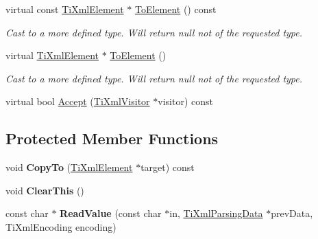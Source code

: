 \begin{DoxyCompactItemize}
\item 
virtual const \hyperlink{classTiXmlElement}{Ti\+Xml\+Element} $\ast$ \hyperlink{classTiXmlElement_ac5b8d0e25fa23fd9acbb6d146082901c}{To\+Element} () const \hypertarget{classTiXmlElement_ac5b8d0e25fa23fd9acbb6d146082901c}{}\label{classTiXmlElement_ac5b8d0e25fa23fd9acbb6d146082901c}

\begin{DoxyCompactList}\small\item\em Cast to a more defined type. Will return null not of the requested type. \end{DoxyCompactList}\item 
virtual \hyperlink{classTiXmlElement}{Ti\+Xml\+Element} $\ast$ \hyperlink{classTiXmlElement_a9def86337ea7a755eb41cac980f60c7a}{To\+Element} ()\hypertarget{classTiXmlElement_a9def86337ea7a755eb41cac980f60c7a}{}\label{classTiXmlElement_a9def86337ea7a755eb41cac980f60c7a}

\begin{DoxyCompactList}\small\item\em Cast to a more defined type. Will return null not of the requested type. \end{DoxyCompactList}\item 
virtual bool \hyperlink{classTiXmlElement_a31ab28cc3b892a69254391d6bbe08df3}{Accept} (\hyperlink{classTiXmlVisitor}{Ti\+Xml\+Visitor} $\ast$visitor) const 
\end{DoxyCompactItemize}
\subsection*{Protected Member Functions}
\begin{DoxyCompactItemize}
\item 
void {\bfseries Copy\+To} (\hyperlink{classTiXmlElement}{Ti\+Xml\+Element} $\ast$target) const \hypertarget{classTiXmlElement_a9e0c1983b840de4134f1f6bf7af00b0f}{}\label{classTiXmlElement_a9e0c1983b840de4134f1f6bf7af00b0f}

\item 
void {\bfseries Clear\+This} ()\hypertarget{classTiXmlElement_a5670933ec2d7d9763b9891acc05d7f7d}{}\label{classTiXmlElement_a5670933ec2d7d9763b9891acc05d7f7d}

\item 
const char $\ast$ {\bfseries Read\+Value} (const char $\ast$in, \hyperlink{classTiXmlParsingData}{Ti\+Xml\+Parsing\+Data} $\ast$prev\+Data, Ti\+Xml\+Encoding encoding)\hypertarget{classTiXmlElement_ac786bce103042d3837c4cc2ff6967d41}{}\label{classTiXmlElement_ac786bce103042d3837c4cc2ff6967d41}

\end{DoxyCompactItemize}

